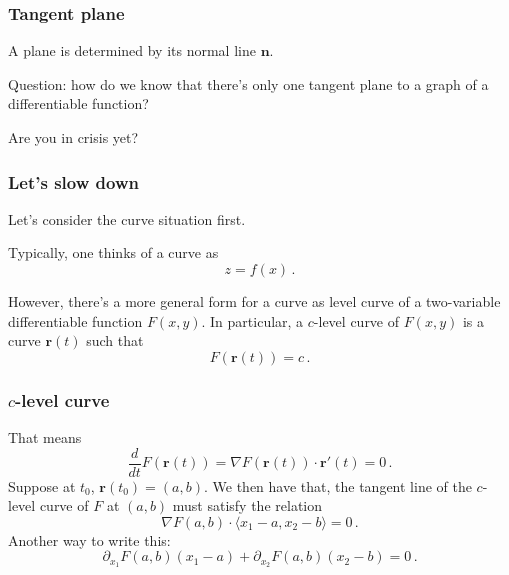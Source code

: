 \documentclass[aspectratio=169,handout]{beamer}
\newcommand{\vect}{\mathbf}
\begin{document}
\begin{frame}
    \frametitle{ Tangent plane }
    A plane is determined by its  normal line $\vect{n}$.

    Question: how do we know that there's only one tangent plane to a graph of 
    a differentiable function?

    \pause
    Are you in crisis yet?
\end{frame}

\begin{frame}
    \frametitle{ Let's slow down }
    Let's consider the curve situation first.

    Typically, one thinks of a curve as
    \begin{equation*}
        z = f(x)\,.
    \end{equation*}

    However, there's a more general form for a curve as level curve of a two-variable
    differentiable function $F(x,y)$.
    In particular, a $c$-level curve of $F(x,y)$
    is a curve $\vect{r}(t)$ such that
    \begin{equation*}
        F(\vect{r}(t)) = c \,.
    \end{equation*}
\end{frame}

\begin{frame}
    \frametitle{ $c$-level curve }
    That means 
    \begin{equation*}
        \frac{d}{dt} F(\vect{r}(t)) = \nabla F (\vect{r}(t)) \cdot \vect{r}'(t)= 0 \,.
    \end{equation*}
    Suppose at $t_0$, $\vect{r}(t_0) = ( a,b )$.
    We then have that, the tangent line of the $c$-level curve of $F$ at $(a,b)$
    must satisfy the relation
    \begin{equation*}
        \nabla F(a,b) \cdot \langle x_1 - a, x_2 - b \rangle = 0\,.
    \end{equation*}
    Another way to write this:
    \begin{equation*}
        \partial_{x_1} F (a,b) (x_1 -a ) + \partial_{x_2} F(a,b) (x_2 - b) = 0\,.
    \end{equation*}


\end{frame}
\end{document}
